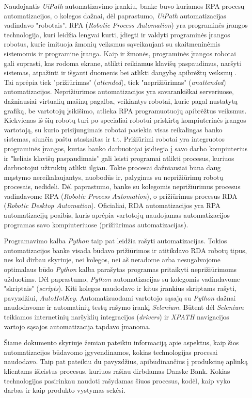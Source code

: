 \documentclass{VUMIFPSBakPrakAt}
\begin{document}
Naudojantis \textit{UiPath} automatizavimo įrankiu, banke buvo kuriamos RPA procesų automatizacijos, o kolegos dažnai, dėl paprastumo, \textit{UiPath} automatizacijas vadindavo "robotais". RPA (\textit{Robotic Process Automation}) yra programinės įrangos technologija, kuri leidžia lengvai kurti, įdiegti ir valdyti programinės įrangos robotus, kurie imituoja žmonių veiksmus sąveikaujant su skaitmeninėmis sistemomis ir programine įranga. Kaip ir žmonės, programinės įrangos robotai gali suprasti, kas rodoma ekrane, atlikti reikiamus klavišų paspaudimus, naršyti sistemas, atpažinti ir išgauti duomenis bei atlikti daugybę apibrėžtų veiksmų \cite{RPADefiniton}. Tai aprėpia tiek "prižiūrimas" (\textit{attended}), tiek "neprižiūrimas" (\textit{unattended}) automatizacijos. Neprižiūrimos automatizacijos yra savarankiškai serveriuose, dažniausiai virtualių mašinų pagalba, veikiantys robotai, kurie pagal nustatytą grafiką, be vartotojų įsikišimo, atlieka RPA programuotuojų apibrėžtus veiksmus. Kiekvienas iš šių robotų turi po specialiai robotui priskirtą kompiuterinės įrangos vartotoją, su kurio prisijungimais robotai pasiekia visas reikalingas banko sistemas, siunčia paštu ataskaitas ir t.t. Prižiūrimi robotai yra integruotos programinės įrangos, kurias banko darbuotojai įsidiegia į savo darbo kompiuterius ir "keliais klavišų paspaudimais" gali leisti programai atlikti procesus, kuriuos darbuotojui užtruktų atlikti ilgiau. Tokie procesai dažniausiai būna daug mąstymo nereikalaujantys, nuobodūs ir, palyginus su neprižiūrimų robotų procesais, nedideli. \cite{RPARDA} Dėl paprastumo, banke su kolegomis neprižiūrimus procesus vadindavome RPA (\textit{Robotic Process Automation}), o prižiūrimus procesus RDA (\textit{Robotic Desktop Automation}). Oficialiai, RDA automatizacijos yra RPA automatizacijų poaibis, kuris aprėpia vartotojų naudojamas automatizacijos programas savo kompiuteriuose (prižiūrimas automatizacijas).
\par
Programavimo kalba \textit{Python} taip pat leidžia rašyti automatizacijas. Tokios automatizacijos banke visada būdavo prižiūrimos ir atitikdavo RDA robotų tipus, nes kol dirbau skyriuje, nei kolegos, nei aš neradome arba nesugalvojome optimalaus būdo \textit{Python} kalba parašytas programas pritaikyti neprižiūrimoms užduotims. Dėl paprastumo, \textit{Python} automatizacijas su kolegomis vadindavome "skriptais" (\textit{scripts}). Kiti kolegos naudodavo ir kitus įrankius skriptams rašyti, pavyzdžiui, \textit{AutoHotKey}. Automatizuodami vartotojo sąsają su \textit{Python} dažnai naudodavome ir automatinių testų rašymo įrankį \textit{Selenium}. Būtent dėl \textit{Selenium} teikiamos internetinių naršyklių integracijos (\textit{drivers}) ir \textit{XPATH} \cite{xpath} navigacijos vartojo sąsajos automatizacija tapdavo įmanoma.
\par
Šiame dokumento skyriuje žemiau pateikiu informaciją apie aspektus, kaip šios automatizacijos būdavomo įgyvendinamos, kokias technologijas procesai naudodavo. Taip pat pateikiu du pavyzdžius, apibūdinančius į produkcinę aplinką klientams išleistus procesus, kuriuos rašiau dirbdamas Danske Bank. Kokias technologijas pasirinkau naudoti rašydamas šiuos procesus, kodėl, kaip vyko darbas ir kaip produkto vystymas sekėsi.
\end{document}
